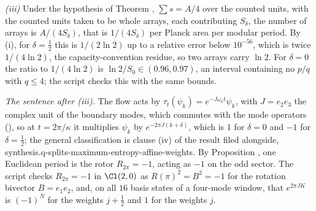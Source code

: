 \emph{(iii)} Under the hypothesis of Theorem , $\sum s = A/4$ over the counted units, with the counted units taken to be whole arrays, each contributing $S_{\delta}$, the number of arrays is $A/(4S_{\delta})$, that is $1/(4S_{\delta})$ per Planck area per modular period. By (i), for $\delta = \tfrac12$ this is $1/(2\ln 2)$ up to a relative error below $10^{-56}$, which is twice $1/(4\ln 2)$, the capacity-convention residue, so two arrays carry $\ln 2$. For $\delta = 0$ the ratio to $1/(4\ln 2)$ is $\ln 2/S_{0} \in (0.96, 0.97)$, an interval containing no $p/q$ with $q \le 4$; the script checks this with the same bounds.

\emph{The sentence after (iii).} The flow acts by $\tau_{t}(\psi_{k}) = e^{-J\omega_{k}t}\psi_{k}$, with $J = e_2e_3$ the complex unit of the boundary modes, which commutes with the mode operators (), so at $t = 2\pi/\kappa$ it multiplies $\psi_{k}$ by $e^{-2\pi J(k + \delta)}$, which is $1$ for $\delta = 0$ and $-1$ for $\delta = \tfrac12$; the general classification is clause (iv) of the result filed alongside, synthesis.q-splits-maximum-entropy-affine-weights. By Proposition , one Euclidean period is the rotor $R_{2\pi} = -1$, acting as $-1$ on the odd sector. The script checks $R_{2\pi} = -1$ in $\Cl(2, 0)$ as $R(\pi)^{2} = B^{2} = -1$ for the rotation bivector $B = e_{1}e_{2}$, and, on all $16$ basis states of a four-mode window, that $e^{2\pi JK}$ is $(-1)^{N}$ for the weights $j + \tfrac12$ and $1$ for the weights $j$.


